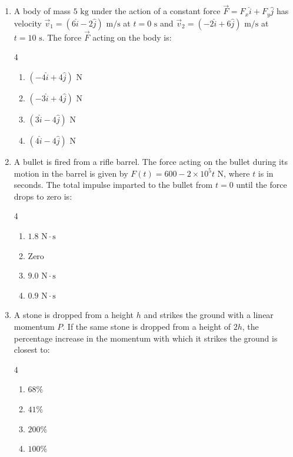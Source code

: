 \documentclass[11pt,a4paper]{article}
\begin{document}
\begin{enumerate}[label=\textbf{\arabic*.},leftmargin=18pt,itemsep=8pt,resume]
  \item A body of mass $5\text{ kg}$ under the action of a constant force $\vec{F} = F_x\hat{i} + F_y\hat{j}$ has velocity $\vec{v}_1 = (6\hat{i} - 2\hat{j})\text{ m/s}$ at $t = 0\text{ s}$ and $\vec{v}_2 = (-2\hat{i} + 6\hat{j})\text{ m/s}$ at $t = 10\text{ s}$. The force $\vec{F}$ acting on the body is:
  \begin{multicols}{4}
    \begin{enumerate}[label=(\Alph*)]
      \item $(-4\hat{i} + 4\hat{j})\text{ N}$
      \item $(-3\hat{i} + 4\hat{j})\text{ N}$
      \item $(3\hat{i} - 4\hat{j})\text{ N}$
      \item $(4\hat{i} - 4\hat{j})\text{ N}$
    \end{enumerate}
  \end{multicols}

  \item A bullet is fired from a rifle barrel. The force acting on the bullet during its motion in the barrel is given by $F(t) = 600 - 2 \times 10^5 t\text{ N}$, where $t$ is in seconds. The total impulse imparted to the bullet from $t = 0$ until the force drops to zero is:
  \begin{multicols}{4}
    \begin{enumerate}[label=(\Alph*)]
      \item $1.8\text{ N}\cdot\text{s}$
      \item $\text{Zero}$
      \item $9.0\text{ N}\cdot\text{s}$
      \item $0.9\text{ N}\cdot\text{s}$
    \end{enumerate}
  \end{multicols}

  \item A stone is dropped from a height $h$ and strikes the ground with a linear momentum $P$. If the same stone is dropped from a height of $2h$, the percentage increase in the momentum with which it strikes the ground is closest to:
  \begin{multicols}{4}
    \begin{enumerate}[label=(\Alph*)]
      \item $68\%$
      \item $41\%$
      \item $200\%$
      \item $100\%$
    \end{enumerate}
  \end{multicols}


\end{enumerate}
\end{document}
